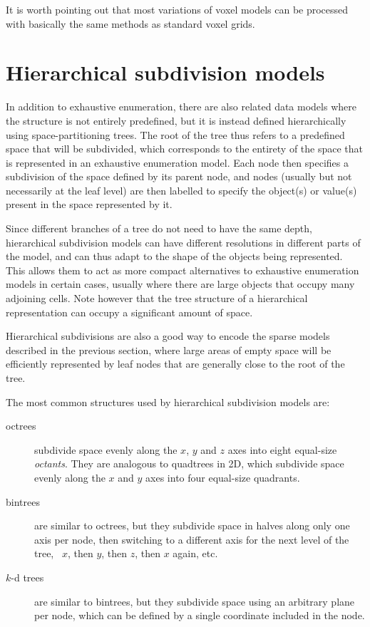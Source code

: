 It is worth pointing out that most variations of voxel models can be processed with basically the same methods as standard voxel grids.

\section{Hierarchical subdivision models}

In addition to exhaustive enumeration, there are also related data models where the structure is not entirely predefined, but it is instead defined hierarchically using space-partitioning trees.
The root of the tree thus refers to a predefined space that will be subdivided, which corresponds to the entirety of the space that is represented in an exhaustive enumeration model.
Each node then specifies a subdivision of the space defined by its parent node, and nodes (usually but not necessarily at the leaf level) are then labelled to specify the object(s) or value(s) present in the space represented by it.

Since different branches of a tree do not need to have the same depth, hierarchical subdivision models can have different resolutions in different parts of the model, and can thus adapt to the shape of the objects being represented.
This allows them to act as more compact alternatives to exhaustive enumeration models in certain cases, usually where there are large objects that occupy many adjoining cells.
Note however that the tree structure of a hierarchical representation can occupy a significant amount of space.

Hierarchical subdivisions are also a good way to encode the sparse models described in the previous section, where large areas of empty space will be efficiently represented by leaf nodes that are generally close to the root of the tree.

The most common structures used by hierarchical subdivision models are:

\begin{description}

\item[octrees] subdivide space evenly along the \(x\), \(y\) and \(z\) axes into eight equal-size \emph{octants}.
They are analogous to quadtrees in 2D, which subdivide space evenly along the \(x\) and \(y\) axes into four equal-size quadrants.

\item[bintrees] are similar to octrees, but they subdivide space in halves along only one axis per node, then switching to a different axis for the next level of the tree, \eg\ \(x\), then \(y\), then \(z\), then \(x\) again, etc.

\item[\(k\)-d trees] are similar to bintrees, but they subdivide space using an arbitrary plane per node, which can be defined by a single coordinate included in the node.

\end{description}

